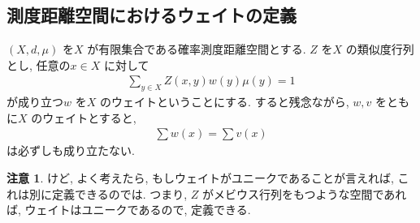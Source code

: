 \documentclass[10pt, fleqn, label-section=none]{bxjsarticle}
\theoremstyle{definition}
\newtheorem{remark}[dfn]{注意}
\renewcommand{\;}{\, ; \,}
\begin{document}
\subsection{測度距離空間におけるウェイトの定義}

$(X, d, \mu)$ を$X$ が有限集合である確率測度距離空間とする. $Z$ を$X$ の類似度行列とし, 任意の$x \in X$ に対して
\begin{align*} \sum_{y \in X} Z(x, y)w(y)\mu(y) = 1 \end{align*}
が成り立つ$w$ を$X$ のウェイトということにする. すると残念ながら, 
$w, v$ をともに$X$ のウェイトとすると, 
\begin{align*} \sum w(x) = \sum v(x) \end{align*}
は必ずしも成り立たない. 

\begin{remark}
けど, よく考えたら, もしウェイトがユニークであることが言えれば, これは別に定義できるのでは. つまり, $Z$ がメビウス行列をもつような空間であれば, ウェイトはユニークであるので, 定義できる. 
\end{remark}
\end{document}
